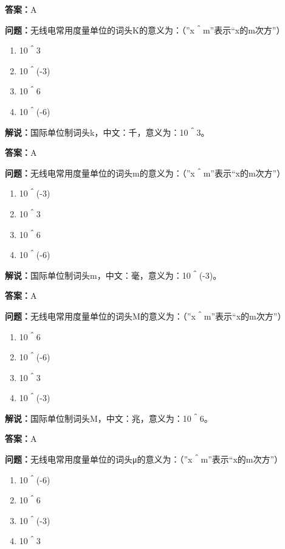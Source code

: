 \textbf{答案：}A

\textbf{问题：}无线电常用度量单位的词头K的意义为：（”x＾m”表示“x的m次方”）

\begin{enumerate}[label=\Alph*), leftmargin=3em]
	\item 10＾3
	\item 10＾(-3)
	\item 10＾6
	\item 10＾(-6)
\end{enumerate}

\textbf{解说：}国际单位制词头k，中文：千，意义为：10＾3。

\textbf{答案：}A

\textbf{问题：}无线电常用度量单位的词头m的意义为：（”x＾m”表示“x的m次方”）

\begin{enumerate}[label=\Alph*), leftmargin=3em]
	\item 10＾(-3)
	\item 10＾3
	\item 10＾6
	\item 10＾(-6)
\end{enumerate}

\textbf{解说：}国际单位制词头m，中文：毫，意义为：10＾(-3)。

\textbf{答案：}A

\textbf{问题：}无线电常用度量单位的词头M的意义为：（”x＾m”表示“x的m次方”）

\begin{enumerate}[label=\Alph*), leftmargin=3em]
	\item 10＾6
	\item 10＾(-6)
	\item 10＾3
	\item 10＾(-3)
\end{enumerate}

\textbf{解说：}国际单位制词头M，中文：兆，意义为：10＾6。

\textbf{答案：}A

\textbf{问题：}无线电常用度量单位的词头μ的意义为：（”x＾m”表示“x的m次方”）

\begin{enumerate}[label=\Alph*), leftmargin=3em]
	\item 10＾(-6)
	\item 10＾6
	\item 10＾(-3)
	\item 10＾3
\end{enumerate}

